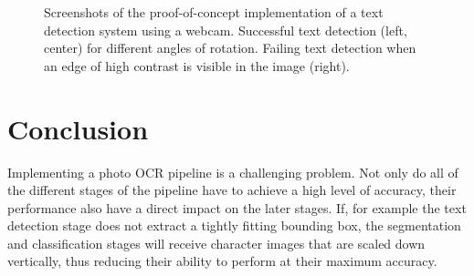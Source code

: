 \documentclass[11pt]{article}
\begin{document}
\begin{figure}[ht]
    \centering
    \caption{
      Screenshots of the proof-of-concept implementation of a text detection system using
      a webcam. Successful text detection (left, center) for different angles of rotation.
      Failing text detection when an edge of high contrast is visible in the image (right).
    }
    \label{fig:webcam}
\end{figure}

\section{Conclusion}
Implementing a photo OCR pipeline is a challenging problem. Not only do all of the different stages
of the pipeline have to achieve a high level of accuracy, their performance also have a direct
impact on the later stages. If, for example the text detection stage does not extract a tightly
fitting bounding box, the segmentation and classification stages will receive character images
that are scaled down vertically, thus reducing their ability to perform at their maximum
accuracy.
\end{document}
